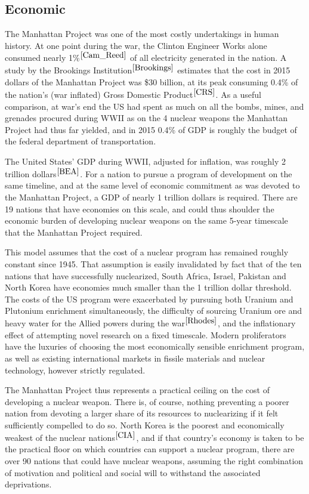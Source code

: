 \documentclass[journal]{IEEEtran}
\begin{document}
\subsection{Economic}
The Manhattan Project was one of the most costly undertakings in human history.  At one point during the war, the Clinton Engineer Works alone consumed nearly 1\%$^{\cite{Cam_Reed}}$ of all electricity generated in the nation.  A study by the Brookings Institution$^{\cite{Brookings}}$ estimates that the cost in 2015 dollars of the Manhattan Project was \$30 billion, at its peak consuming 0.4\% of the nation's (war inflated) Gross Domestic Product$^{\cite{CRS}}$.  As a useful comparison, at war's end the US had spent as much on all the bombs, mines, and grenades procured during WWII as on the 4 nuclear weapons the Manhattan Project had thus far yielded, and in 2015 0.4\% of GDP is roughly the budget of the federal department of transportation.\par 
The United States' GDP during WWII, adjusted for inflation, was roughly 2 trillion dollars$^{\cite{BEA}}$.  For a nation to pursue a program of development on the same timeline, and at the same level of economic commitment as was devoted to the Manhattan Project, a GDP of nearly 1 trillion dollars is required. There are 19 nations that have economies on this scale, and could thus shoulder the economic burden of developing nuclear weapons on the same 5-year timescale that the Manhattan Project required.\par
This model assumes that the cost of a nuclear program has remained roughly constant since 1945.  That assumption is easily invalidated by fact that of the ten nations that have successfully nuclearized, South Africa, Israel, Pakistan and North Korea have economies much smaller than the 1 trillion dollar threshold.  The costs of the US program were exacerbated by pursuing both Uranium and Plutonium enrichment simultaneously, the difficulty of sourcing Uranium ore and heavy water for the Allied powers during the war$^{\cite{Rhodes}}$, and the inflationary effect of attempting novel research on a fixed timescale.  Modern proliferators have the luxuries of choosing the most economically sensible enrichment program, as well as existing international markets in fissile materials and nuclear technology, however strictly regulated.\par
The Manhattan Project thus represents a practical ceiling on the cost of developing a nuclear weapon.  There is, of course, nothing preventing a poorer nation from devoting a larger share of its resources to nuclearizing if it felt sufficiently compelled to do so.  North Korea is the poorest and economically weakest of the nuclear nations$^{\cite{CIA}}$, and if that country's economy is taken to be the practical floor on which countries can support a nuclear program, there are over 90 nations that could have nuclear weapons, assuming the right combination of motivation and political and social will to withstand the associated deprivations.
\end{document}
